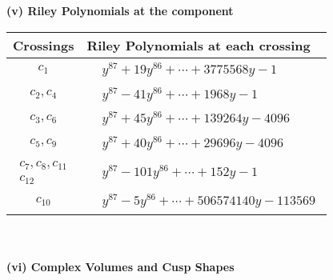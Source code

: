 \documentclass[1p]{elsarticle_modified}
\theoremstyle{definition}
\begin{document}
\newpage\renewcommand{\arraystretch}{1}
\flushleft \textbf{(v) Riley Polynomials at the component}\newline \\
\begin{tabular}{m{50pt}|m{274pt}}
Crossings & \hspace{64pt}Riley Polynomials at each crossing \\
\hline $$\begin{aligned}c_{1}\end{aligned}$$&$\begin{aligned}
&y^{87}+19 y^{86}+\cdots+3775568 y-1
\end{aligned}$\\
\hline $$\begin{aligned}c_{2},c_{4}\end{aligned}$$&$\begin{aligned}
&y^{87}-41 y^{86}+\cdots+1968 y-1
\end{aligned}$\\
\hline $$\begin{aligned}c_{3},c_{6}\end{aligned}$$&$\begin{aligned}
&y^{87}+45 y^{86}+\cdots+139264 y-4096
\end{aligned}$\\
\hline $$\begin{aligned}c_{5},c_{9}\end{aligned}$$&$\begin{aligned}
&y^{87}+40 y^{86}+\cdots+29696 y-4096
\end{aligned}$\\
\hline $$\begin{aligned}c_{7},c_{8},c_{11}\\c_{12}\end{aligned}$$&$\begin{aligned}
&y^{87}-101 y^{86}+\cdots+152 y-1
\end{aligned}$\\
\hline $$\begin{aligned}c_{10}\end{aligned}$$&$\begin{aligned}
&y^{87}-5 y^{86}+\cdots+506574140 y-113569
\end{aligned}$\\
\hline
\end{tabular}\\~\\
\newpage\flushleft \textbf{(vi) Complex Volumes and Cusp Shapes}
\end{document}
